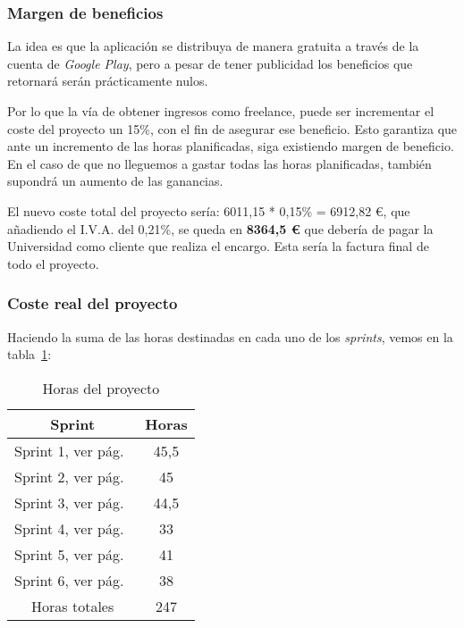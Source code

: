 \subsubsection{Margen de beneficios}
La idea es que la aplicación se distribuya de manera gratuita a través de la cuenta de \emph{Google Play}, pero a pesar de tener publicidad los beneficios que retornará serán prácticamente nulos.

Por lo que la vía de obtener ingresos como freelance, puede ser incrementar el coste del proyecto un 15\%, con el fin de asegurar ese beneficio. Esto garantiza que ante un incremento de las horas planificadas, siga existiendo margen de beneficio. En el caso de que no lleguemos a gastar todas las horas planificadas, también supondrá un aumento de las ganancias.

El nuevo coste total del proyecto sería: 6011,15 * 0,15\% = 6912,82  €, que añadiendo el I.V.A. del 0,21\%, se queda en \textbf{8364,5 €} que debería de pagar la Universidad como cliente que realiza el encargo. Esta sería la factura final de todo el proyecto.

\subsubsection{Coste real del proyecto}
Haciendo la suma de las horas destinadas en cada uno de los \emph{sprints}, vemos en la tabla~\ref{table:horas}:

\begin{table}[H]
	\begin{center}
		\begin{tabular}{cc}
			\hline
			Sprint                        & Horas   	\\ \hline
			Sprint 1, ver pág.~\pageref{sprint-1-220620---260620}					    & 45,5     		\\
			Sprint 2, ver pág.~\pageref{sprint-1-270620---010720}					    & 45    		\\
			Sprint 3, ver pág.~\pageref{sprint-3-020720---070720}					    & 44,5  		\\
			Sprint 4, ver pág.~\pageref{sprint-4-070720---100720}					    & 33     		\\
			Sprint 5, ver pág.~\pageref{sprint-5-11072020---15072020}	& 41     			    		\\
			Sprint 6, ver pág.~\pageref{sprint-6-16072020---20072020}					    & 38    		\\  \hline
			Horas totales            	 		& 247			\\ \hline
		\end{tabular}
		\caption{Horas del proyecto}
		\label{table:horas}
	\end{center}
\end{table}


